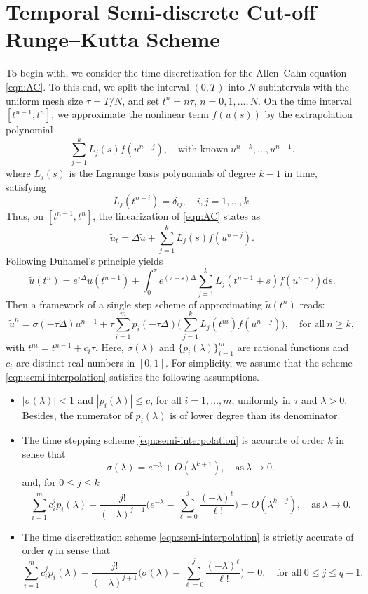\documentclass[a4paper, oneside]{book}
\def\d{{\mathrm{d}}}
\def\d{\mathrm{d}}
\begin{document}
\section{Temporal Semi-discrete Cut-off Runge--Kutta Scheme}\label{sec:2.1}
To begin with, we consider the time discretization for the Allen--Cahn equation \eqref{eqn:AC}.
To this end, we split the interval $(0,T)$ into $N$ subintervals with the uniform mesh size $\tau=T/N$,
and set $t^n = n\tau$, $n=0,1,\ldots,N$.
On the time interval $[t^{n-1},t^n]$, we approximate the nonlinear term $f(u(s))$ by the extrapolation polynomial
$$
 \sum_{j=1}^{k} L_j(s) f(u^{n-j}),\quad \text{with known}~ u^{n-k},\ldots,u^{n-1}.
$$
where $L_j(s)$ is the Lagrange basis polynomials of degree $k-1$ in time, satisfying
$$
L_j(t^{n-i}) = \delta_{ij}, \quad i,j=1,\dots,k.
$$
Thus, on $[t^{n-1},t^n]$, the linearization of \eqref{eqn:AC} states as
$$\tilde{u}_t=\Delta\tilde{u}+\sum_{j=1}^{k} L_j(s) f(u^{n-j}).$$
Following Duhamel's principle yields
$$\tilde{u}(t^{n})=e^{\tau\Delta}u(t^{n-1})+\int_0^\tau e^{(\tau-s)\Delta}\sum_{j=1}^{k} L_j(t^{n-1}+s) f(u^{n-j})\d s.$$
Then a framework of a single step scheme of approximating $\tilde{u}(t^{n})$ reads:
\begin{equation}\label{eqn:semi-interpolation}
\tilde u^{n} = \sigma(-\tau\Delta) u^{n-1} + \tau \sum_{i=1}^m p_i(-\tau \Delta)
\Big(\sum_{j=1}^{k} L_j (t^{ni}) f(u^{n-j})\Big),\quad \text{for all}~n\ge k,
\end{equation}
with $t^{ni}=t^{n-1} + c_i\tau$.
Here,
$\sigma(\lambda)$ and $\{p_i(\lambda)\}^m_{i=1}$ are rational functions and $c_i$ are distinct real numbers in $[0,1]$.
For simplicity, we assume that the scheme \eqref{eqn:semi-interpolation} satisfies the following assumptions.

\begin{itemize}
\item[{\bf (P1)}] $|\sigma(\lambda)|< 1$ and $|p_i(\lambda)|\le c$, for all $i=1,\ldots,m$,
uniformly in $\tau$ and $\lambda > 0$. Besides, the numerator of $p_i(\lambda)$
is of lower degree than its denominator.
\item[{\bf (P2)}] The time stepping scheme \eqref{eqn:semi-interpolation}  is accurate of order $k$ in sense that
$$ \sigma(\lambda) = e^{-\lambda} + O(\lambda^{k+1}),\quad \text{as}~\lambda\rightarrow0. $$
and, for $0\le j\le k$
$$ \sum_{i=1}^m c_i^j p_i(\lambda) - \frac{j!}{(-\lambda)^{j+1}}\Big(e^{-\lambda}
- \sum_{\ell=0}^j \frac{(-\lambda)^\ell}{\ell!}\Big) = O(\lambda^{k-j}),\quad \text{as}~\lambda\rightarrow0. $$
\item[{\bf (P3)}] The time discretization scheme \eqref{eqn:semi-interpolation} is strictly accurate of order $q$ in sense that
$$ \sum_{i=1}^m c_i^j p_i(\lambda) - \frac{j!}{(-\lambda)^{j+1}}\Big(\sigma(\lambda)
- \sum_{\ell=0}^j \frac{(-\lambda)^\ell}{\ell!}\Big) =0,\quad\text{for all}~ 0\le j\le q-1. $$
\end{itemize}
\end{document}
